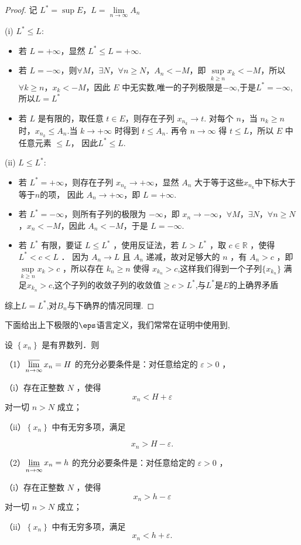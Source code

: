\begin{proof}
	记 $L^* = \sup E$，$L = \lim\limits_{n \to \infty} A_n$
	
	(i) $L^* \leqslant L$:
	
	\begin{itemize}
		\item 若 $L = +\infty$，显然 $L^* \leqslant L = +\infty$.
		\item 若 $L = -\infty$，则$\forall M$，$\exists N$，$\forall n \geqslant N$，$A_n < -M$，即 $\sup\limits_{k \geqslant n} x_k < -M$，所以$\forall k \geqslant n$，$x_k < -M$，因此 $E$ 中无实数,唯一的子列极限是$-\infty$,于是$L^*=-\infty$,所以$L=L^*$
		\item 若 $L$ 是有限的，取任意 $t \in E$，则存在子列 $x_{n_k} \to t$.
		对每个 $n$，当 $n_k \geqslant n$ 时，$x_{n_k} \leqslant A_n$.当 $k \to +\infty$ 时得到 $t \leqslant A_n$.
		再令 $n \to \infty$ 得 $t \leqslant L$，所以 $E$ 中任意元素 $\leqslant L$， 因此$L^* \leqslant L$.
	\end{itemize}
	
	(ii) $L \leqslant L^*$:
	\begin{itemize}
		\item 若 $L^* = +\infty$，则存在子列 $x_{n_k} \to +\infty$，显然 $A_n$ 大于等于这些$x_{n_k}$中下标大于等于$n$的项， 因此 $A_n \to +\infty$，即 $L = +\infty$.
		\item 若 $L^* = -\infty$，则所有子列的极限为 $-\infty$，即 $x_n \to -\infty$，$\forall M$，$\exists N$，$\forall n \geqslant N$，$x_n < -M$，因此 $A_n < -M$，于是 $L = -\infty$.
		\item 若 $L^*$ 有限，要证 $L \leqslant L^*$
		，使用反证法，若 $L>L^*$ ，取 $c \in \mathbb{R}$ ，使得$L^*<c<L$ ．
		因为 $A_n \to L$ 且 $A_n$ 递减，故对足够大的 $n$ ，有 $A_n>c$ ，即  $\sup\limits_{k \geqslant n} x_k>c$ ，所以存在 $k_n \geqslant n$ 使得 $x_{k_n}>c$,这样我们得到一个子列$\{x_{k_n}\}$ 满足$x_{k_n}>c$,这个子列的收敛子列的收敛值$\geqslant c>L^*$,与$L^*$是$E$的上确界矛盾
	\end{itemize}
	综上$L=L^*$,对$B_n$与下确界的情况同理.
	
\end{proof}
下面给出上下极限的$\eps$语言定义，我们常常在证明中使用到,\textbf{}
\begin{proposition}\label{3.6.4}
	设 $\left\{x_n\right\}$ 是有界数列．则
	
	（1）$\varlimsup\limits_{n \rightarrow \infty} x_n=H$ 的充分必要条件是：对任意给定的 $\varepsilon>0$ ，
	
	（i）存在正整数 $N$ ，使得
	$$
	x_n<H+\varepsilon
	$$
	对一切 $n>N$ 成立；
	
	（ii）$\left\{x_n\right\}$ 中有无穷多项，满足
	
	$$
	x_n>H-\varepsilon .
	$$
	
	（2）$\varliminf\limits_{n \rightarrow \infty} x_n=h$ 的充分必要条件是：对任意给定的 $\varepsilon>0$ ，
	
	（i）存在正整数 $N$ ，使得
	$$
	x_n>h-\varepsilon
	$$
	对一切 $n>N$ 成立；
	
	（ii）$\left\{x_n\right\}$ 中有无穷多项，满足
	$$
	x_n<h+\varepsilon .
	$$
	
\end{proposition}
